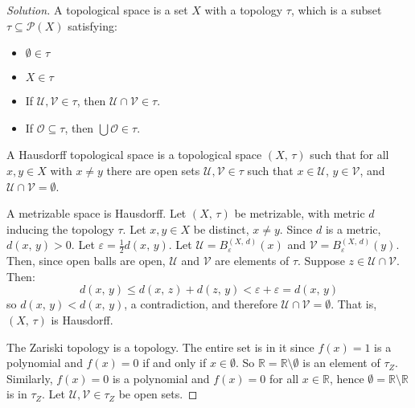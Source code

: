 \documentclass{article}
\theoremstyle{normal}
\begin{document}
    \begin{proof}[Solution]
        A topological space is a set $X$ with a topology $\tau$, which is a
        subset $\tau\subseteq\mathcal{P}(X)$ satisfying:
        \begin{itemize}
            \item $\emptyset\in\tau$
            \item $X\in\tau$
            \item If $\mathcal{U},\mathcal{V}\in\tau$, then
                $\mathcal{U}\cap\mathcal{V}\in\tau$.
            \item If $\mathcal{O}\subseteq\tau$, then
                $\bigcup\mathcal{O}\in\tau$.
        \end{itemize}
        A Hausdorff topological space is a topological space $(X,\,\tau)$ such
        that for all $x,y\in{X}$ with $x\ne{y}$ there are open sets
        $\mathcal{U},\mathcal{V}\in\tau$ such that $x\in\mathcal{U}$,
        $y\in\mathcal{V}$, and $\mathcal{U}\cap\mathcal{V}=\emptyset$.
        \par\hfill\par
        A metrizable space is Hausdorff. Let $(X,\,\tau)$ be metrizable, with
        metric $d$ inducing the topology $\tau$. Let $x,y\in{X}$ be distinct,
        $x\ne{y}$. Since $d$ is a metric, $d(x,\,y)>0$. Let
        $\varepsilon=\frac{1}{2}d(x,\,y)$. Let
        $\mathcal{U}=B_{\varepsilon}^{(X,\,d)}(x)$ and
        $\mathcal{V}=B_{\varepsilon}^{(X,\,d)}(y)$. Then, since open balls are
        open, $\mathcal{U}$ and $\mathcal{V}$ are elements of $\tau$.
        Suppose $z\in\mathcal{U}\cap\mathcal{V}$. Then:
        \begin{equation}
            d(x,\,y)\leq{d}(x,\,z)+d(z,\,y)
                <\varepsilon+\varepsilon
                =d(x,\,y)
        \end{equation}
        so $d(x,\,y)<d(x,\,y)$, a contradiction, and therefore
        $\mathcal{U}\cap\mathcal{V}=\emptyset$. That is, $(X,\,\tau)$ is
        Hausdorff.
        \par\hfill\par
        The Zariski topology is a topology. The entire set is in it since
        $f(x)=1$ is a polynomial and $f(x)=0$ if and only if $x\in\emptyset$.
        So $\mathbb{R}=\mathbb{R}\setminus\emptyset$ is an element of
        $\tau_{Z}$. Similarly, $f(x)=0$ is a polynomial and $f(x)=0$ for all
        $x\in\mathbb{R}$, hence $\emptyset=\mathbb{R}\setminus\mathbb{R}$ is
        in $\tau_{Z}$. Let $\mathcal{U},\mathcal{V}\in\tau_{Z}$ be open sets.

\end{proof}
\end{document}
